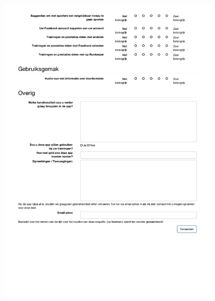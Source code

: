 \begin{figure}[ht]
  \begin{center}
    \includegraphics[width=\textwidth]{style/images/Enquete2}
  \end{center}
  \label{fig:enquete2}
\end{figure}

